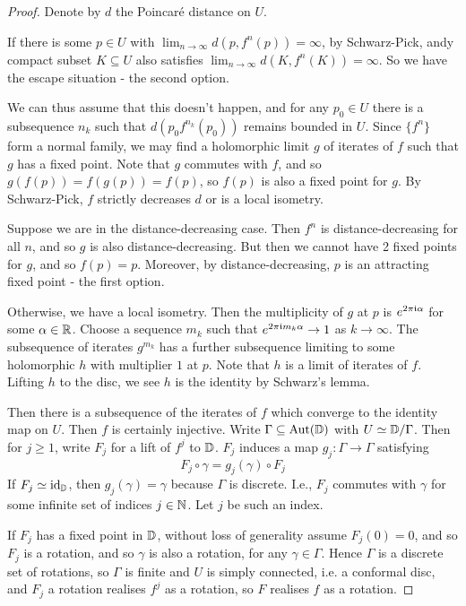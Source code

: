 \documentclass[10pt,a4paper]{article}
\begin{document}
\begin{proof}
  Denote by $d$ the Poincar\'e distance on $U$.

  If there is some $p \in U$ with $\lim_{n\to\infty} d(p, f^n(p)) = \infty$, by Schwarz-Pick, andy compact subset $K \subseteq U$ also satisfies $\lim_{n\to\infty} d(K, f^n(K)) = \infty$. So we have the escape situation - the second option.

  We can thus assume that this doesn't happen, and for any $p_0 \in U$ there is a subsequence $n_k$ such that $d(p_0 f^{n_k}(p_0))$ remains bounded in $U$. Since $\{f^n\}$ form a normal family, we may find a holomorphic limit $g$ of iterates of $f$ such that $g$ has a fixed point. Note that $g$ commutes with $f$, and so $g(f(p)) = f(g(p)) = f(p)$, so $f(p)$ is also a fixed point for $g$. By Schwarz-Pick, $f$ strictly decreases $d$ or is a local isometry.

  Suppose we are in the distance-decreasing case. Then $f^n$ is distance-decreasing for all $n$, and so $g$ is also distance-decreasing. But then we cannot have 2 fixed points for $g$, and so $f(p) = p$. Moreover, by distance-decreasing, $p$ is an attracting fixed point - the first option.

  Otherwise, we have a local isometry. Then the multiplicity of $g$ at $p$ is $e^{2\pi\mathfrak{i}\alpha}$ for some $\alpha \in \mathbb{R}$. Choose a sequence $m_k$ such that $e^{2\pi\mathfrak{i} m_k \alpha} \to 1$ as $k \to \infty$. The subsequence of iterates $g^{m_k}$ has a further subsequence limiting to some holomorphic $h$ with multiplier $1$ at $p$. Note that $h$ is a limit of iterates of $f$. Lifting $h$ to the disc, we see $h$ is the identity by Schwarz's lemma.

  Then there is a subsequence of the iterates of $f$ which converge to the identity map on $U$. Then $f$ is certainly injective. Write $\Gamma \subseteq \operatorname{Aut}(\mathbb{D})$ with $U \simeq \mathbb{D}/\Gamma$. Then for $j \geq 1$, write $F_j$ for a lift of $f^j$ to $\mathbb{D}$. $F_j$ induces a map $g_j : \Gamma \to \Gamma$ satisfying
  \[F_j\circ\gamma = g_j(\gamma)\circ F_j\]
  If $F_j \simeq \operatorname{id}_{\mathbb{D}}$, then $g_j(\gamma) = \gamma$ because $\Gamma$ is discrete. I.e., $F_j$ commutes with $\gamma$ for some infinite set of indices $j \in \mathbb{N}$. Let $j$ be such an index.

  If $F_j$ has a fixed point in $\mathbb{D}$, without loss of generality assume $F_j(0) = 0$, and so $F_j$ is a rotation, and so $\gamma$ is also a rotation, for any $\gamma \in \Gamma$. Hence $\Gamma$ is a discrete set of rotations, so $\Gamma$ is finite and $U$ is simply connected, i.e. a conformal disc, and $F_j$ a rotation realises $f^j$ as a rotation, so $F$ realises $f$ as a rotation.


\end{proof}
\end{document}
